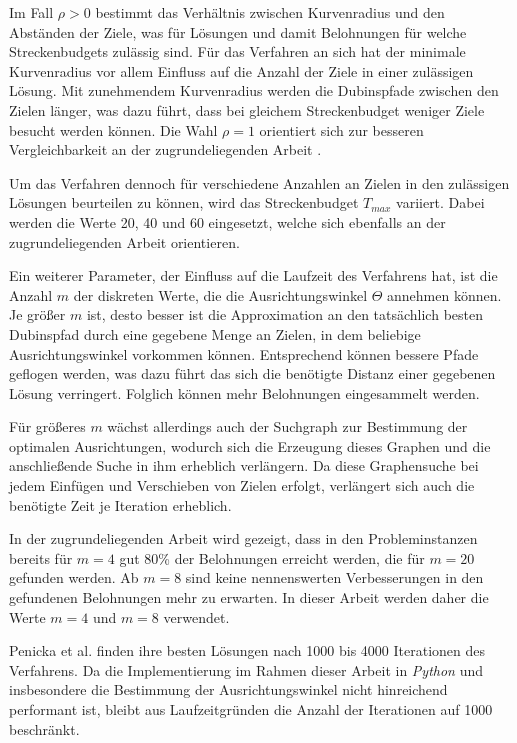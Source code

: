 \documentclass[12pt,a4paper,twoside]{article}
\theoremstyle{definition}
\numberwithin{equation}{section}
\begin{document}
Im Fall $\rho > 0$ bestimmt das Verhältnis zwischen Kurvenradius und den Abständen der Ziele, was für Lösungen und damit Belohnungen für welche Streckenbudgets zulässig sind. Für das Verfahren an sich hat der minimale Kurvenradius vor allem Einfluss auf die Anzahl der Ziele in einer zulässigen Lösung. Mit zunehmendem Kurvenradius werden die Dubinspfade zwischen den Zielen länger, was dazu führt, dass bei gleichem Streckenbudget weniger Ziele besucht werden können. Die Wahl $\rho = 1$ orientiert sich zur besseren Vergleichbarkeit an der zugrundeliegenden Arbeit \cite{R.Penicka.2017}.

Um das Verfahren dennoch für verschiedene Anzahlen an Zielen in den zulässigen Lösungen beurteilen zu können, wird das Streckenbudget $T_{max}$ variiert. Dabei werden die Werte 20, 40 und 60 eingesetzt, welche sich ebenfalls an der zugrundeliegenden Arbeit orientieren.

Ein weiterer Parameter, der Einfluss auf die Laufzeit des Verfahrens hat, ist die Anzahl $m$ der diskreten Werte, die die Ausrichtungswinkel $\Theta$ annehmen können. Je größer $m$ ist, desto besser ist die Approximation an den tatsächlich besten Dubinspfad durch eine gegebene Menge an Zielen, in dem beliebige Ausrichtungswinkel vorkommen können. Entsprechend können bessere Pfade geflogen werden, was dazu führt das sich die benötigte Distanz einer gegebenen Lösung verringert. Folglich können mehr Belohnungen eingesammelt werden.

Für größeres $m$ wächst allerdings auch der Suchgraph zur Bestimmung der optimalen Ausrichtungen, wodurch sich die Erzeugung dieses Graphen und die anschließende Suche in ihm erheblich verlängern. Da diese Graphensuche bei jedem Einfügen und Verschieben von Zielen erfolgt, verlängert sich auch die benötigte Zeit je Iteration erheblich.

In der zugrundeliegenden Arbeit wird gezeigt, dass in den Probleminstanzen bereits für $m = 4$ gut 80\% der Belohnungen erreicht werden, die für $m=20$ gefunden werden. Ab $m = 8$ sind keine nennenswerten Verbesserungen in den gefundenen Belohnungen mehr zu erwarten.
In dieser Arbeit werden daher die Werte $m = 4$ und $m = 8$ verwendet.

Penicka et al. \cite{R.Penicka.2017} finden ihre besten Lösungen nach 1000 bis 4000  Iterationen des Verfahrens. Da die Implementierung im Rahmen dieser Arbeit in \textit{Python} und insbesondere die Bestimmung der Ausrichtungswinkel nicht hinreichend performant ist, bleibt aus Laufzeitgründen die Anzahl der Iterationen auf 1000 beschränkt.
\end{document}
